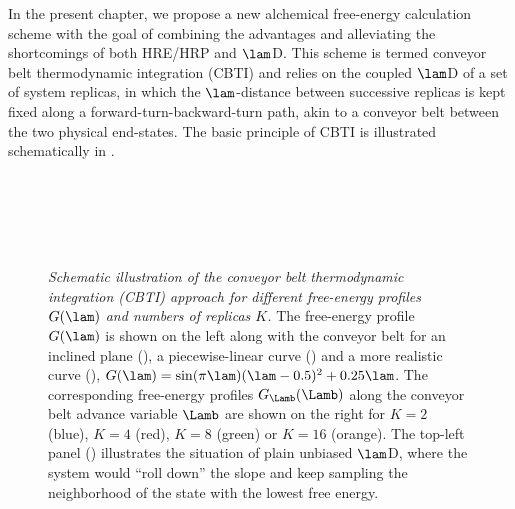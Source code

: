 In the present chapter, we propose a new alchemical free-energy calculation scheme with the goal of combining the advantages and alleviating the shortcomings of both HRE/HRP and $\lam$D. This scheme is termed conveyor belt thermodynamic integration (CBTI) and relies on the coupled $\lam$D of a set of system replicas, in which the $\lam$-distance between successive replicas is kept fixed along a forward-turn-backward-turn path, akin to a conveyor belt between the two physical end-states. The basic principle of CBTI is illustrated schematically in .

\begin{figure}
  \centering
  \hfill%
  \\
  \hfill%
  \\
  \hfill%
  \\
  \hfill%
  \\
  
  \caption{\footnotesize
\textit{Schematic illustration of the conveyor belt thermodynamic integration (CBTI) approach for different free-energy profiles $G(\lam)$ and numbers of replicas $K$.} The free-energy profile $G(\lam)$ is shown on the left along with the conveyor belt for an inclined plane (), a piecewise-linear curve () and a more realistic curve (),
$G(\lam)=\sin (\pi \lam)(\lam-0.5)^2+0.25\lam$.
%
The corresponding free-energy profiles $G_{\Lamb}(\Lamb)$ 
along the conveyor belt advance variable $\Lamb$  are shown on the right for $K=2$ (blue), $K=4$ (red), $K=8$ (green) or $K=16$ (orange).
%
The top-left panel () illustrates the situation of plain unbiased $\lam$D, 
where the system would ``roll down'' the slope and keep sampling the neighborhood of the state with the lowest free energy.
%
}
  \label{fig:scheme}
\end{figure}

